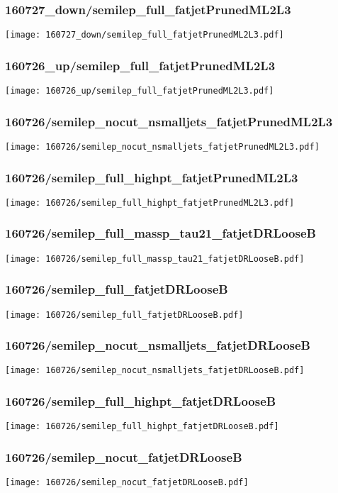 \begin{frame}
   \frametitle{\small 160727\_down/semilep\_full\_fatjetPrunedML2L3}
   \centering
   \texttt{[image: 160727\_down/semilep\_full\_fatjetPrunedML2L3.pdf]}
\end{frame}

\begin{frame}
   \frametitle{\small 160726\_up/semilep\_full\_fatjetPrunedML2L3}
   \centering
   \texttt{[image: 160726\_up/semilep\_full\_fatjetPrunedML2L3.pdf]}
\end{frame}

\begin{frame}
   \frametitle{\small 160726/semilep\_nocut\_nsmalljets\_fatjetPrunedML2L3}
   \centering
   \texttt{[image: 160726/semilep\_nocut\_nsmalljets\_fatjetPrunedML2L3.pdf]}
\end{frame}

\begin{frame}
   \frametitle{\small 160726/semilep\_full\_highpt\_fatjetPrunedML2L3}
   \centering
   \texttt{[image: 160726/semilep\_full\_highpt\_fatjetPrunedML2L3.pdf]}
\end{frame}

\begin{frame}
   \frametitle{\small 160726/semilep\_full\_massp\_tau21\_fatjetDRLooseB}
   \centering
   \texttt{[image: 160726/semilep\_full\_massp\_tau21\_fatjetDRLooseB.pdf]}
\end{frame}

\begin{frame}
   \frametitle{\small 160726/semilep\_full\_fatjetDRLooseB}
   \centering
   \texttt{[image: 160726/semilep\_full\_fatjetDRLooseB.pdf]}
\end{frame}

\begin{frame}
   \frametitle{\small 160726/semilep\_nocut\_nsmalljets\_fatjetDRLooseB}
   \centering
   \texttt{[image: 160726/semilep\_nocut\_nsmalljets\_fatjetDRLooseB.pdf]}
\end{frame}

\begin{frame}
   \frametitle{\small 160726/semilep\_full\_highpt\_fatjetDRLooseB}
   \centering
   \texttt{[image: 160726/semilep\_full\_highpt\_fatjetDRLooseB.pdf]}
\end{frame}

\begin{frame}
   \frametitle{\small 160726/semilep\_nocut\_fatjetDRLooseB}
   \centering
   \texttt{[image: 160726/semilep\_nocut\_fatjetDRLooseB.pdf]}
\end{frame}

